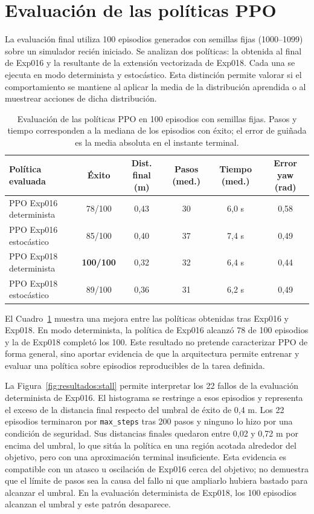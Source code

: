 \section{Evaluación de las políticas PPO} \label{sct:resultados:evaluacion}

La evaluación final utiliza 100 episodios generados con semillas fijas
(1000--1099) sobre un simulador recién iniciado. Se analizan dos políticas: la
obtenida al final de Exp016 y la resultante de la extensión vectorizada de
Exp018. Cada una se ejecuta en modo determinista y estocástico. Esta distinción
permite valorar si el comportamiento se mantiene al aplicar la media de la
distribución aprendida o al muestrear acciones de dicha distribución.

\begin{table}[H]
\centering
\small
\setlength{\tabcolsep}{4pt}
\renewcommand{\arraystretch}{1.15}
\begin{tabular}{lccccc}
\hline
\textbf{Política evaluada} & \textbf{Éxito} & \textbf{Dist. final (m)} & \textbf{Pasos (med.)} & \textbf{Tiempo (med.)} & \textbf{Error yaw (rad)} \\
\hline
PPO Exp016 determinista & 78/100 & 0,43 & 30 & 6,0 s & 0,58 \\
PPO Exp016 estocástico  & 85/100 & 0,40 & 37 & 7,4 s & 0,49 \\
PPO Exp018 determinista & \textbf{100/100} & 0,32 & 32 & 6,4 s & 0,44 \\
PPO Exp018 estocástico  & 89/100 & 0,36 & 31 & 6,2 s & 0,49 \\
\hline
\end{tabular}
\caption{Evaluación de las políticas PPO en 100 episodios con semillas fijas.
Pasos y tiempo corresponden a la mediana de los episodios con éxito; el error de
guiñada es la media absoluta en el instante terminal.}
\label{tab:resultados:evaluacion_politicas}
\end{table}

El Cuadro~\ref{tab:resultados:evaluacion_politicas} muestra una mejora entre las
políticas obtenidas tras Exp016 y Exp018. En modo determinista, la política de
Exp016 alcanzó 78 de 100 episodios y la de Exp018 completó los 100. Este
resultado no pretende caracterizar PPO de forma general, sino aportar evidencia
de que la arquitectura permite entrenar y evaluar una política sobre episodios
reproducibles de la tarea definida.

La Figura~\ref{fig:resultados:stall} permite interpretar los 22 fallos de la
evaluación determinista de Exp016. El histograma se restringe a esos episodios y
representa el exceso de la distancia final respecto del umbral de éxito de 0,4 m.
Los 22 episodios terminaron por \texttt{max\_steps} tras 200 pasos y ninguno lo
hizo por una condición de seguridad. Sus distancias finales quedaron entre 0,02
y 0,72 m por encima del umbral, lo que sitúa la política en una región acotada
alrededor del objetivo, pero con una aproximación terminal insuficiente. Esta
evidencia es compatible con un atasco u oscilación de Exp016 cerca del objetivo;
no demuestra que el límite de pasos sea la causa del fallo ni que ampliarlo
hubiera bastado para alcanzar el umbral. En la evaluación determinista de Exp018,
los 100 episodios alcanzan el umbral y este patrón desaparece.

